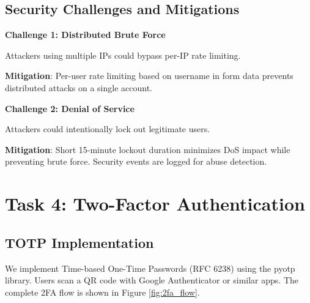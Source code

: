 \documentclass[12pt,a4paper]{article}
\begin{document}
\subsection{Security Challenges and Mitigations}

\textbf{Challenge 1: Distributed Brute Force}

Attackers using multiple IPs could bypass per-IP rate limiting.

\textbf{Mitigation}: Per-user rate limiting based on username in form data prevents distributed attacks on a single account.

\textbf{Challenge 2: Denial of Service}

Attackers could intentionally lock out legitimate users.

\textbf{Mitigation}: Short 15-minute lockout duration minimizes DoS impact while preventing brute force. Security events are logged for abuse detection.

\section{Task 4: Two-Factor Authentication}

\subsection{TOTP Implementation}

We implement Time-based One-Time Passwords (RFC 6238) using the pyotp library. Users scan a QR code with Google Authenticator or similar apps. The complete 2FA flow is shown in Figure \ref{fig:2fa_flow}.
\end{document}
